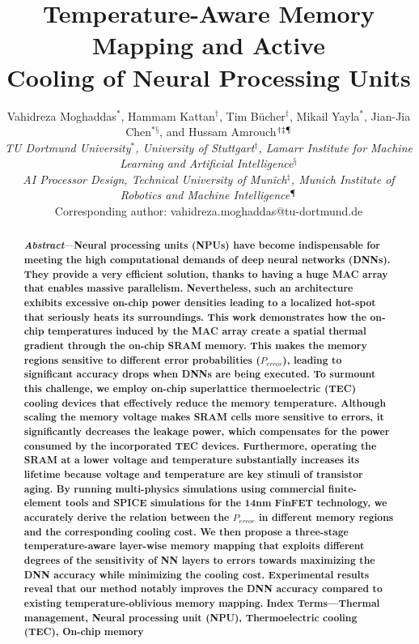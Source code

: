 \documentclass[sigconf]{acmart}
\begin{document}
\title{Temperature-Aware Memory Mapping and Active\\Cooling of Neural Processing Units}

\author{%
    \large Vahidreza Moghaddas$^*$, Hammam Kattan$^\dagger$, Tim Bücher$^\dagger$, Mikail Yayla$^*$, Jian-Jia Chen$^{*§}$, and Hussam Amrouch$^{\dagger\ddagger\mathparagraph}$\\
    \textit{\large TU Dortmund University$^*$, University of Stuttgart$^\dagger$, Lamarr Institute for Machine Learning and Artificial Intelligence$^§$}\\
    \textit{\large AI Processor Design, Technical University of Munich$^{\ddagger}$, Munich Institute of Robotics and Machine Intelligence$^{\mathparagraph}$}\\
    \large Corresponding author: vahidreza.moghaddas@tu-dortmund.de
}

\renewcommand{\shortauthors}{Trovato et al.}

\renewcommand{\abstractname}{}
\begin{abstract}
    \textit{\textbf{Abstract}}---\textbf{Neural processing units (NPUs) have become indispensable for meeting the high computational demands of deep neural networks (DNNs). They provide a very efficient solution, thanks to having a huge MAC array that enables massive parallelism. Nevertheless, such an architecture exhibits excessive on-chip power densities leading to a localized hot-spot that seriously heats its surroundings. This work demonstrates how the on-chip temperatures induced by the MAC array create a spatial thermal gradient through the on-chip SRAM memory. This makes the memory regions sensitive to different error probabilities ($P_{error}$), leading to significant accuracy drops when DNNs are being executed. To surmount this challenge, we employ on-chip superlattice thermoelectric (TEC) cooling devices that effectively reduce the memory temperature. Although scaling the memory voltage makes SRAM cells more sensitive to errors, it significantly decreases the leakage power, which compensates for the power consumed by the incorporated TEC devices. Furthermore, operating the SRAM at a lower voltage and temperature substantially increases its lifetime because voltage and temperature are key stimuli of transistor aging. By running multi-physics simulations using commercial finite-element tools and SPICE simulations for the 14nm FinFET technology, we accurately derive the relation between the $P_{error}$ in different memory regions and the corresponding cooling cost. We then propose a three-stage temperature-aware layer-wise memory mapping that exploits different degrees of the sensitivity of NN layers to errors towards maximizing the DNN accuracy while minimizing the cooling cost. Experimental results reveal that our method notably improves the DNN accuracy compared to existing temperature-oblivious memory mapping.}
    \textbf{Index Terms—Thermal management, Neural processing unit (NPU), Thermoelectric cooling (TEC), On-chip memory}
\end{abstract}
\end{document}
